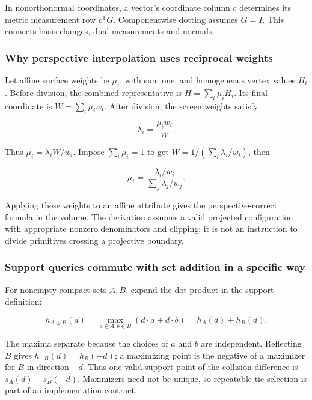 In nonorthonormal coordinates, a vector's coordinate column \(c\) determines its metric measurement row \(c^\mathsf TG\). Componentwise dotting assumes \(G=I\). This connects basis changes, dual measurements and normals.

\subsubsection{Why perspective interpolation uses reciprocal weights}\label{02-foundations-ii-ch039-why-perspective-interpolation-uses-reciprocal-weights}

\hypertarget{02-foundations-ii-ch039-why-perspective-interpolation-uses-reciprocal-weights}{}

Let affine surface weights be \(\mu_i\), with sum one, and homogeneous vertex values \(H_i\). Before division, the combined representative is \(H=\sum_i\mu_iH_i\). Its final coordinate is \(W=\sum_i\mu_iw_i\). After division, the screen weights satisfy

\[
\lambda_i=\frac{\mu_iw_i}{W}.
\]

Thus \(\mu_i=\lambda_iW/w_i\). Impose \(\sum_i\mu_i=1\) to get \(W=1/(\sum_i\lambda_i/w_i)\), then

\[
\mu_i=\frac{\lambda_i/w_i}{\sum_j\lambda_j/w_j}.
\]

Applying these weights to an affine attribute gives the perspective-correct formula in the volume. The derivation assumes a valid projected configuration with appropriate nonzero denominators and clipping; it is not an instruction to divide primitives crossing a projective boundary.

\subsubsection{Support queries commute with set addition in a specific way}\label{02-foundations-ii-ch039-support-queries-commute-with-set-addition-in-a-specific-way}

\hypertarget{02-foundations-ii-ch039-support-queries-commute-with-set-addition-in-a-specific-way}{}

For nonempty compact sets \(A,B\), expand the dot product in the support definition:

\[
h_{A\oplus B}(d)=\max_{a\in A,b\in B}(d\cdot a+d\cdot b)
=h_A(d)+h_B(d).
\]

The maxima separate because the choices of \(a\) and \(b\) are independent. Reflecting \(B\) gives \(h_{-B}(d)=h_B(-d)\); a maximizing point is the negative of a maximizer for \(B\) in direction \(-d\). Thus one valid support point of the collision difference is \(s_A(d)-s_B(-d)\). Maximizers need not be unique, so repeatable tie selection is part of an implementation contract.

